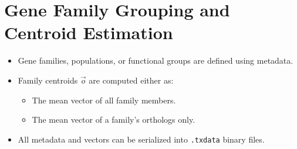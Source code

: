 \section{Gene Family Grouping and Centroid Estimation}\label{sec:centroid_estimation}
    \begin{itemize}
        \item Gene families, populations, or functional groups are defined using
          metadata.
        \item Family centroids \( \vec{o} \) are computed either as:
        \begin{itemize}
            \item The mean vector of all family members.
            \item The mean vector of a family's orthologs only.
        \end{itemize}
        \item All metadata and vectors can be serialized into \texttt{.txdata}
          binary files.
    \end{itemize}